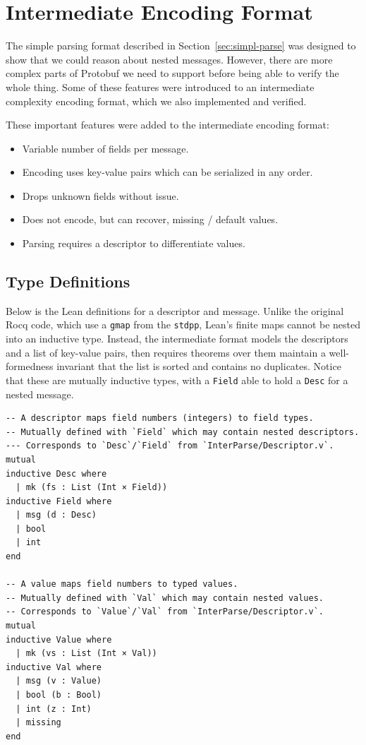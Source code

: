 \section{Intermediate Encoding Format}\label{sec:inter-parse}
The simple parsing format described in Section~\ref{sec:simpl-parse} was
designed to show that we could reason about nested messages. However, there are
more complex parts of Protobuf we need to support before being able to verify
the whole thing. Some of these features were introduced to an intermediate
complexity encoding format, which we also implemented and verified.

These important features were added to the intermediate encoding format:
\begin{itemize}
\item Variable number of fields per message.
\item Encoding uses key-value pairs which can be serialized in any order.
\item Drops unknown fields without issue.
\item Does not encode, but can recover, missing / default values.
\item Parsing requires a descriptor to differentiate values.
\end{itemize}

\subsection{Type Definitions}\label{sec:ip-types}
Below is the Lean definitions for a descriptor and message. Unlike the original
Rocq code, which use a \texttt{gmap} from the \texttt{stdpp}, Lean's finite maps
cannot be nested into an inductive type. Instead, the intermediate format models
the descriptors and a list of key-value pairs, then requires theorems over them
maintain a well-formedness invariant that the list is sorted and contains no
duplicates. Notice that these are mutually inductive types, with a
\texttt{Field} able to hold a \texttt{Desc} for a nested message.

\begin{verbatim}
-- A descriptor maps field numbers (integers) to field types.
-- Mutually defined with `Field` which may contain nested descriptors.
--- Corresponds to `Desc`/`Field` from `InterParse/Descriptor.v`.
mutual
inductive Desc where
  | mk (fs : List (Int × Field))
inductive Field where
  | msg (d : Desc)
  | bool
  | int
end

-- A value maps field numbers to typed values.
-- Mutually defined with `Val` which may contain nested values.
-- Corresponds to `Value`/`Val` from `InterParse/Descriptor.v`.
mutual
inductive Value where
  | mk (vs : List (Int × Val))
inductive Val where
  | msg (v : Value)
  | bool (b : Bool)
  | int (z : Int)
  | missing
end
\end{verbatim}

